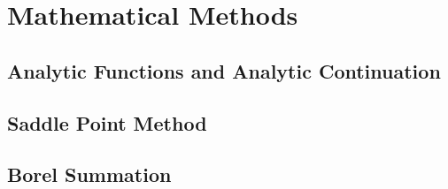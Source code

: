 \chapter{Mathematical Methods}

\section{Analytic Functions and Analytic Continuation}


\section{Saddle Point Method}


\section{Borel Summation}
